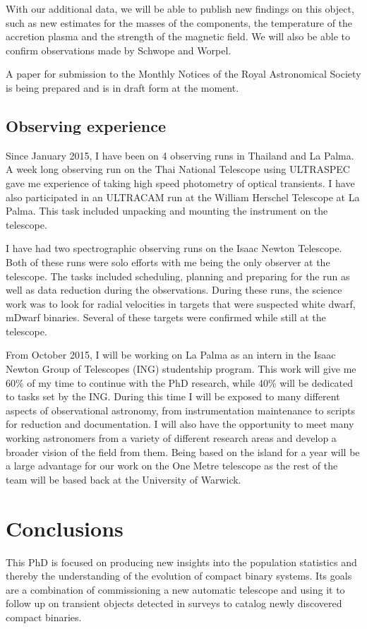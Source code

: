 \documentclass[a4paper,fleqn,usenatbib]{mnras}
\begin{document}
With our additional data, we will be able to publish new findings on this object, such as new estimates for the masses of the components, the temperature of the accretion plasma and the strength of the magnetic field. We will also be able to confirm observations made by Schwope and Worpel. 

A paper for submission to the Monthly Notices of the Royal Astronomical Society is being prepared and is in draft form at the moment. 

\subsection{Observing experience}
Since January 2015, I have been on 4 observing runs in Thailand and La Palma. A week long observing run on the Thai National Telescope using ULTRASPEC gave me experience of taking high speed photometry of optical transients. I have also participated in an ULTRACAM run at the William Herschel Telescope at La Palma. This task included unpacking and mounting the instrument on the telescope. 

I have had two spectrographic observing runs on the Isaac Newton Telescope. Both of these runs were solo efforts with me being the only observer at the telescope. The tasks included scheduling, planning and preparing for the run as well as data reduction during the observations. During these runs, the science work was to look for radial velocities in targets that were suspected white dwarf, mDwarf binaries. Several of these targets were confirmed while still at the telescope.  

From October 2015, I will be working on La Palma as an intern in the Isaac Newton Group of Telescopes (ING) studentship program. This work will give me 60\% of my time to continue with the PhD research, while 40\% will be dedicated to tasks set by the ING. During this time I will be exposed to many different aspects of observational astronomy, from instrumentation maintenance to scripts for reduction and documentation. I will also have the opportunity to meet many working astronomers from a variety of different research areas and develop a broader vision of the field from them.  Being based on the island for a year will be a large advantage for our work on the One Metre telescope as the rest of the team will be based back at the University of Warwick.  

\section{Conclusions}
This PhD is focused on producing new insights into the population statistics and thereby the understanding of the evolution of compact binary systems. Its goals are a combination of commissioning a new automatic telescope and using it to follow up on transient objects detected in surveys to catalog newly discovered compact binaries. 
\end{document}
